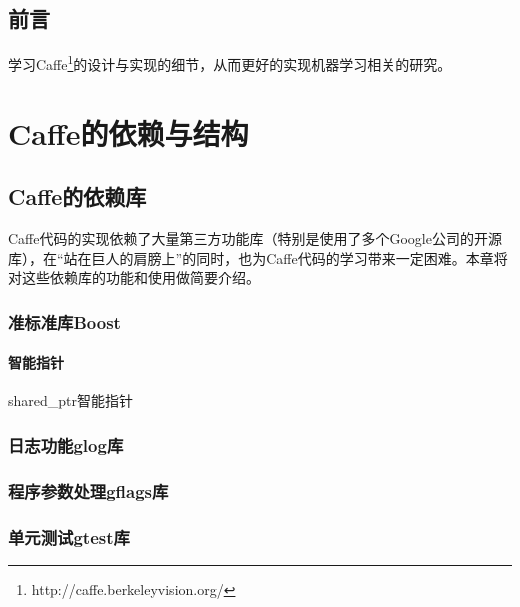 \documentclass{../CNTeXBookTemplate/NanCNBook}
\title{\hei\chuhao{Caffe\cite{jia2014caffe}解析}}
\author{nannanmath}
\begin{document}
\maketitle{}
\thispagestyle{empty}

\frontmatter
\pagestyle{plain}
\chapter*{前{\quad}言}
学习Caffe\footnote{http://caffe.berkeleyvision.org/}的设计与实现的细节，从而更好的实现机器学习相关的研究。

\tableofcontents
\listoffigures
\listoftables

\mainmatter
\pagestyle{fancy}

\part{Caffe的依赖与结构}




\chapter{Caffe的依赖库}
Caffe代码的实现依赖了大量第三方功能库（特别是使用了多个Google公司的开源库），在“站在巨人的肩膀上”的同时，也为Caffe代码的学习带来一定困难。本章将对这些依赖库的功能和使用做简要介绍。
\section{准标准库Boost}
\subsection{智能指针}\label{deps/boost/pointer}
shared\_ptr智能指针
\section{日志功能glog库}\label{deps/glog}

\section{程序参数处理gflags库}\label{deps/gflags}

\section{单元测试gtest库}
\end{document}
